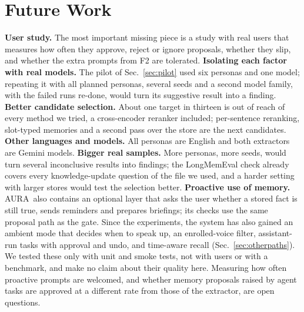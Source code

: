 \IfFileExists{IEEEtran.cls}{\documentclass[journal]{IEEEtran}\def\HAVEIEEE{1}}{\documentclass[10pt,twocolumn]{article}\usepackage[margin=0.7in,columnsep=0.25in]{geometry}}
\newcommand{\aura}{AURA}
\begin{document}
\section{Future Work}
\label{sec:future}
\textbf{User study.} The most important missing piece is a study with real users that measures how often they approve, reject or ignore proposals, whether they slip, and whether the extra prompts from F2 are tolerated. \textbf{Isolating each factor with real models.} The pilot of Sec.~\ref{sec:pilot} used six personas and one model; repeating it with all planned personas, several seeds and a second model family, with the failed runs re-done, would turn its suggestive result into a finding. \textbf{Better candidate selection.} About one target in thirteen is out of reach of every method we tried, a cross-encoder reranker included; per-sentence reranking, slot-typed memories and a second pass over the store are the next candidates. \textbf{Other languages and models.} All personas are English and both extractors are Gemini models. \textbf{Bigger real samples.} More personas, more seeds, would turn several inconclusive results into findings; the LongMemEval check already covers every knowledge-update question of the file we used, and a harder setting with larger stores would test the selection better. \textbf{Proactive use of memory.} \aura\ also contains an optional layer that asks the user whether a stored fact is still true, sends reminders and prepares briefings; its checks use the same proposal path as the gate. Since the experiments, the system has also gained an ambient mode that decides when to speak up, an enrolled-voice filter, assistant-run tasks with approval and undo, and time-aware recall (Sec.~\ref{sec:otherpaths}). We tested these only with unit and smoke tests, not with users or with a benchmark, and make no claim about their quality here. Measuring how often proactive prompts are welcomed, and whether memory proposals raised by agent tasks are approved at a different rate from those of the extractor, are open questions.
\end{document}

